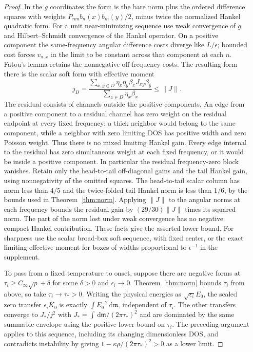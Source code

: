 \documentclass[11pt]{article}
\newcommand{\dd}{\,\mathrm{d}}
\newcommand{\Cinf}{C_\infty}
\begin{document}
\begin{proof}
In the $g$ coordinates the form is the bare norm plus the ordered difference squares with weights $P_{nm}b_n(x)b_m(y)/2$, minus twice the normalized Hankel quadratic form. For a unit near-minimizing sequence use weak convergence of $g$ and Hilbert--Schmidt convergence of the Hankel operator. On a positive component the same-frequency angular difference costs diverge like $L/\epsilon$; bounded cost forces $v_{n,x}$ in the limit to be constant across that component at each $n$. Fatou's lemma retains the nonnegative off-frequency costs. The resulting form there is the scalar soft form with effective moment
\[
 j_D=\frac{\sum_{x,y\in D}\eta_x\eta_y\beta_x J_{xy}\beta_y}
 {\sum_{x\in D}\eta_x\beta_x}\le\|J\| .
\]
The residual consists of channels outside the positive components. An edge from a positive component to a residual channel has zero weight on the residual endpoint at every fixed frequency: a thick neighbor would belong to the same component, while a neighbor with zero limiting DOS has positive width and zero Poisson weight. Thus there is no mixed limiting Hankel gain. Every edge internal to the residual has zero simultaneous weight at each fixed frequency, or it would be inside a positive component. In particular the residual frequency-zero block vanishes. Retain only the head-to-tail off-diagonal gains and the tail Hankel gain, using nonnegativity of the omitted squares. The head-to-tail scalar column has norm less than $4/5$ and the twice-folded tail Hankel norm is less than $1/6$, by the bounds used in Theorem~\ref{thm:norm}. Applying $\|J\|$ to the angular norms at each frequency bounds the residual gain by $(29/30)\|J\|$ times its squared norm. The part of the norm lost under weak convergence has no negative compact Hankel contribution. These facts give the asserted lower bound. For sharpness use the scalar broad-box soft sequence, with fixed center, or the exact limiting effective moment for boxes of widths proportional to $\epsilon^{-1}$ in the supplement.

To pass from a fixed temperature to onset, suppose there are negative forms at $\tau_i\ge\Cinf\sqrt{\rho}+\delta$ for some $\delta>0$ and $\epsilon_i\to0$. Theorem~\ref{thm:norm} bounds $\tau_i$ from above, so take $\tau_i\to\tau_*>0$. Writing the physical energies as $\sqrt{\epsilon_i}E_0$, the scaled zero transfer $\epsilon_i K_0$ is exactly $\int E_0^{-2}\dd\mathfrak m$, independent of $\tau_i$. The other transfers converge to $J_*/j^2$ with $J_*=\int\dd\mathfrak m/(2\pi\tau_*)^2$ and are dominated by the same summable envelope using the positive lower bound on $\tau_i$. The preceding argument applies to this sequence, including its changing dimensionless DOS, and contradicts instability by giving $1-\kappa\rho/(2\pi\tau_*)^2>0$ as a lower limit.
\end{proof}
\end{document}
